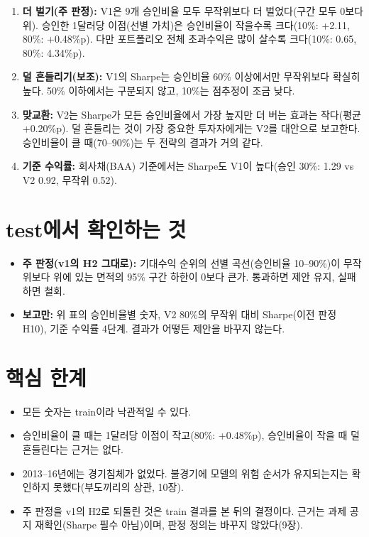 \begin{enumerate}[leftmargin=*]
\item \textbf{더 벌기(주 판정):} V1은 9개 승인비율 모두 무작위보다 더 벌었다(구간 모두 0보다 위). 승인한 1달러당 이점(선별 가치)은 승인비율이 작을수록 크다(10\%: +2.11, 80\%: +0.48\%p). 다만 포트폴리오 전체 초과수익은 많이 살수록 크다(10\%: 0.65, 80\%: 4.34\%p).
\item \textbf{덜 흔들리기(보조):} V1의 Sharpe는 승인비율 60\% 이상에서만 무작위보다 확실히 높다. 50\% 이하에서는 구분되지 않고, 10\%는 점추정이 조금 낮다.
\item \textbf{맞교환:} V2는 Sharpe가 모든 승인비율에서 가장 높지만 더 버는 효과는 작다(평균 +0.20\%p). 덜 흔들리는 것이 가장 중요한 투자자에게는 V2를 대안으로 보고한다. 승인비율이 클 때(70--90\%)는 두 전략의 결과가 거의 같다.
\item \textbf{기준 수익률:} 회사채(BAA) 기준에서는 Sharpe도 V1이 높다(승인 30\%: 1.29 vs V2 0.92, 무작위 0.52).
\end{enumerate}

\section*{test에서 확인하는 것}
\begin{itemize}[leftmargin=*]
\item \textbf{주 판정(v1의 H2 그대로):} 기대수익 순위의 선별 곡선(승인비율 10--90\%)이 무작위보다 위에 있는 면적의 95\% 구간 하한이 0보다 큰가. 통과하면 제안 유지, 실패하면 철회.
\item \textbf{보고만:} 위 표의 승인비율별 숫자, V2 80\%의 무작위 대비 Sharpe(이전 판정 H10), 기준 수익률 4단계. 결과가 어떻든 제안을 바꾸지 않는다.
\end{itemize}

\section*{핵심 한계}
\begin{itemize}[leftmargin=*]
\item 모든 숫자는 train이라 낙관적일 수 있다.
\item 승인비율이 클 때는 1달러당 이점이 작고(80\%: +0.48\%p), 승인비율이 작을 때 덜 흔들린다는 근거는 없다.
\item 2013--16년에는 경기침체가 없었다. 불경기에 모델의 위험 순서가 유지되는지는 확인하지 못했다(부도끼리의 상관, 10장).
\item 주 판정을 v1의 H2로 되돌린 것은 train 결과를 본 뒤의 결정이다. 근거는 과제 공지 재확인(Sharpe 필수 아님)이며, 판정 정의는 바꾸지 않았다(9장).
\end{itemize}


